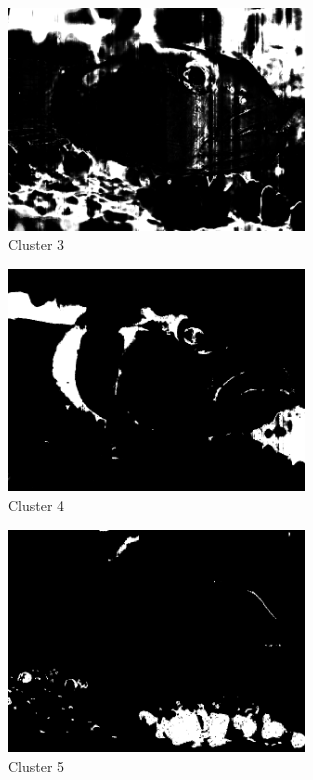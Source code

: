 \documentclass{article}      %
\begin{document}
\begin{figure}[H]
\centering
\includegraphics[width=0.7\textwidth]{partc_wts_cluster2}
\caption{Cluster 3}
\end{figure}

\begin{figure}[H]
\centering
\includegraphics[width=0.7\textwidth]{partc_wts_cluster3}
\caption{Cluster 4}
\end{figure}

\begin{figure}[H]
\centering
\includegraphics[width=0.7\textwidth]{partc_wts_cluster4}
\caption{Cluster 5}
\end{figure}
\end{document}
